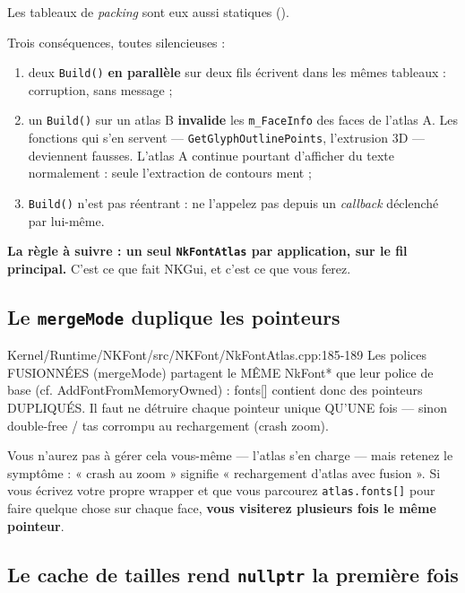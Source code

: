 Les tableaux de \emph{packing} sont eux aussi statiques
().

\begin{nkpiege}
Trois conséquences, toutes silencieuses :
\begin{enumerate}
  \item deux \texttt{Build()} \textbf{en parallèle} sur deux fils écrivent dans
        les mêmes tableaux : corruption, sans message ;
  \item un \texttt{Build()} sur un atlas B \textbf{invalide} les
        \texttt{m\_FaceInfo} des faces de l'atlas A. Les fonctions qui s'en
        servent — \texttt{GetGlyphOutlinePoints}, l'extrusion 3D — deviennent
        fausses. L'atlas A continue pourtant d'afficher du texte normalement :
        seule l'extraction de contours ment ;
  \item \texttt{Build()} n'est pas réentrant : ne l'appelez pas depuis un
        \emph{callback} déclenché par lui-même.
\end{enumerate}
\textbf{La règle à suivre : un seul \texttt{NkFontAtlas} par application, sur le
fil principal.} C'est ce que fait NKGui, et c'est ce que vous ferez.
\end{nkpiege}

\subsection{Le \texttt{mergeMode} duplique les pointeurs}

\begin{nkcode}{Kernel/Runtime/NKFont/src/NKFont/NkFontAtlas.cpp:185-189}
 Les polices FUSIONNÉES (mergeMode) partagent le MÊME NkFont* que leur police de
 base (cf. AddFontFromMemoryOwned) : fonts[] contient donc des pointeurs DUPLIQUÉS.
 Il faut ne détruire chaque pointeur unique QU'UNE fois — sinon double-free / tas
 corrompu au rechargement (crash zoom).
\end{nkcode}

Vous n'aurez pas à gérer cela vous-même — l'atlas s'en charge — mais retenez le
symptôme : « crash au zoom » signifie « rechargement d'atlas avec fusion ». Si
vous écrivez votre propre wrapper et que vous parcourez \texttt{atlas.fonts[]}
pour faire quelque chose sur chaque face, \textbf{vous visiterez plusieurs fois
le même pointeur}.

\subsection{Le cache de tailles rend \texttt{nullptr} la première fois}

